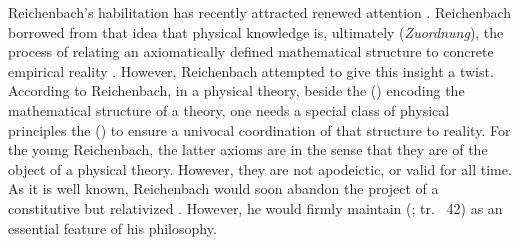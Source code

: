 \documentclass[draft]{article}
\newcommand{\WT}{Weyl's theory\xspace}
\newcommand{\rhp}[2]{(\cite[#1]{Reichenbach1920a}; tr.\ \citeyear{Reichenbach1969} #2)\xspace}
\begin{document}

Reichenbach's habilitation has recently attracted renewed attention \citep{Friedman2001}. Reichenbach borrowed from \citet{Schlick1918} that idea that physical knowledge is, ultimately (\emph{Zuordnung}), the process of relating an axiomatically defined mathematical structure to concrete empirical reality \citep{Padovani2009}. However, Reichenbach attempted  to give this insight a  twist. According to Reichenbach, in a physical theory, beside the  () encoding the mathematical structure of a theory, one needs a special class of physical principles the  () to ensure a univocal coordination of that structure to reality. For the young Reichenbach, the latter axioms are \apr in the sense that they are  of the object of a physical theory. However, they are not apodeictic, or valid for all time. As it is well known, Reichenbach would soon abandon the project of a constitutive but relativized \apr. However, he would firmly maintain  \rhp{40}{42} as an essential feature of his philosophy.







\end{document}
